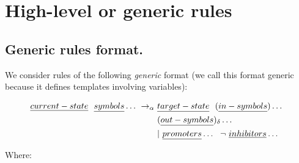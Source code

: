 \section{High-level or generic rules}

\subsection{\label{sec:cps:genericrules}Generic rules format.}
We consider rules of the following \emph{generic} format 
(we call this format generic because it defines templates involving variables):
\begin{framed}
\vspace{-0.6cm}
\begin{align*}
\emph{current-state} ~~ \emph{symbols} \dots ~ \rightarrow_\alpha ~ & \emph{target-state} ~~ (\emph{in-symbols}) \dots ~~ \\
 & (\emph{out-symbols})_\delta \dots \\
 & | ~  \emph{promoters} \dots ~~ \neg ~  \emph{inhibitors} \dots
\end{align*}
\vspace{-0.8cm}
\end{framed}
Where:
